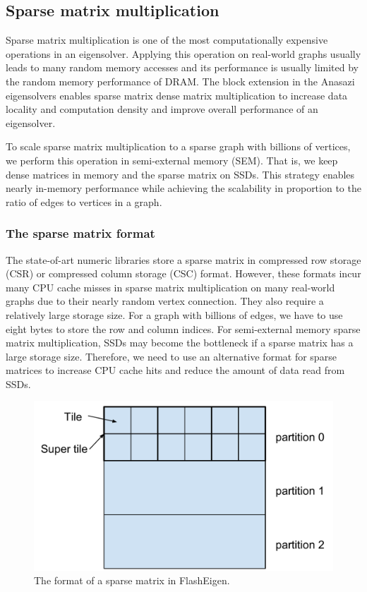 \subsection{Sparse matrix multiplication} \label{spmm}
Sparse matrix multiplication is one of the most computationally expensive
operations in an eigensolver. Applying this operation on real-world graphs
usually leads to many random memory accesses and its performance is usually
limited by the random memory performance of DRAM. The block extension
in the Anasazi eigensolvers enables sparse matrix dense matrix multiplication
to increase data locality and computation density and improve overall performance
of an eigensolver.

To scale sparse matrix multiplication to a sparse graph with billions of vertices,
we perform this operation in semi-external memory (SEM). That is, we keep dense
matrices in memory and the sparse
matrix on SSDs. This strategy enables nearly in-memory performance while achieving
the scalability in proportion to the ratio of edges to vertices in a graph.

\subsubsection{The sparse matrix format}
The state-of-art numeric libraries store a sparse matrix in compressed row storage
(CSR) or compressed column storage (CSC) format. However, these formats incur
many CPU cache misses in sparse matrix multiplication on many real-world graphs
due to their nearly random vertex connection. They also require a relatively
large storage size. For a graph with billions of edges, we have to use eight
bytes to store the row and column indices. For semi-external memory sparse
matrix multiplication, SSDs may become the bottleneck if a sparse matrix has
a large storage size.
Therefore, we need to use an alternative format for sparse matrices to increase
CPU cache hits and reduce the amount of data read from SSDs.

\begin{figure}
\centering
\includegraphics[scale=0.3]{./sparse_mat.pdf}
\vspace{-5pt}
\caption{The format of a sparse matrix in FlashEigen.}
\vspace{-5pt}
\label{sparse_mat}
\end{figure}

